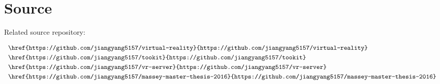 \label{appendix-source}
\chapter{Source}

Related source repository:

\[
\begin{array}{lr}
\begin{aligned}
&\code{\href{https://github.com/jiangyang5157/virtual-reality}{https://github.com/jiangyang5157/virtual-reality}}\\
&\code{\href{https://github.com/jiangyang5157/tookit}{https://github.com/jiangyang5157/tookit}}\\
&\code{\href{https://github.com/jiangyang5157/vr-server}{https://github.com/jiangyang5157/vr-server}}\\
&\code{\href{https://github.com/jiangyang5157/massey-master-thesis-2016}{https://github.com/jiangyang5157/massey-master-thesis-2016}}\\
\end{aligned}
\end{array}
\]

